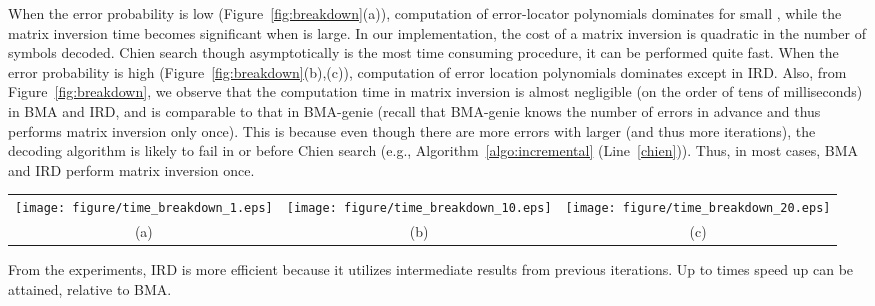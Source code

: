 \documentclass[10pt,journal,letterpaper,compsoc]{IEEEtran}
\newcommand{\0}{{\bf 0}}
\begin{document}
When the error probability is low (Figure~\ref{fig:breakdown}(a)), computation
of error-locator polynomials dominates for small , while the
matrix inversion time becomes significant when  is large. In our
implementation, the cost of a matrix inversion is quadratic in the number of
symbols decoded. Chien search though asymptotically is the most time consuming
procedure, it can be performed quite fast. When the error
probability is high (Figure~\ref{fig:breakdown}(b),(c)), computation of error location polynomials
dominates except in IRD. Also, from Figure~\ref{fig:breakdown},
we observe that the computation time in matrix inversion is almost
negligible (on the order of tens of milliseconds) in BMA and IRD, and
is comparable to that in BMA-genie (recall that BMA-genie knows the number of
errors in advance and thus performs matrix inversion only once). This is
because even though there are more errors with larger  (and thus more
iterations), the decoding algorithm is likely to fail in or before Chien search
(e.g., Algorithm~\ref{algo:incremental} (Line~\ref{chien})). Thus, in most
cases, BMA and IRD perform matrix inversion once.

\begin{figure*}[thp]
\begin{center}
\begin{tabular}{ccc}
\texttt{[image: figure/time\_breakdown\_1.eps]} &
\texttt{[image: figure/time\_breakdown\_10.eps]} &
\texttt{[image: figure/time\_breakdown\_20.eps]} \\
(a)  &
(b)  &
(c)  
\end{tabular}
\caption{Average computational time breakdown for decoding one MDS codeword,
. Because IRD progressively decodes, its performance
does not deteriorate with an increasing Byzantine node rate, .}
\label{fig:breakdown}
\end{center}
\end{figure*}

From the experiments, IRD is more efficient because it utilizes intermediate results from
previous iterations. Up to  times speed up can be attained, relative to
BMA.
\begin{comment}
Also, the computation complexity in
Section~\ref{sect:complexity} only provides the worst-case order analysis. In
practice, the computation time in the average case can differ significantly in
part due to hidden constant factors.
\end{comment}
\end{document}
